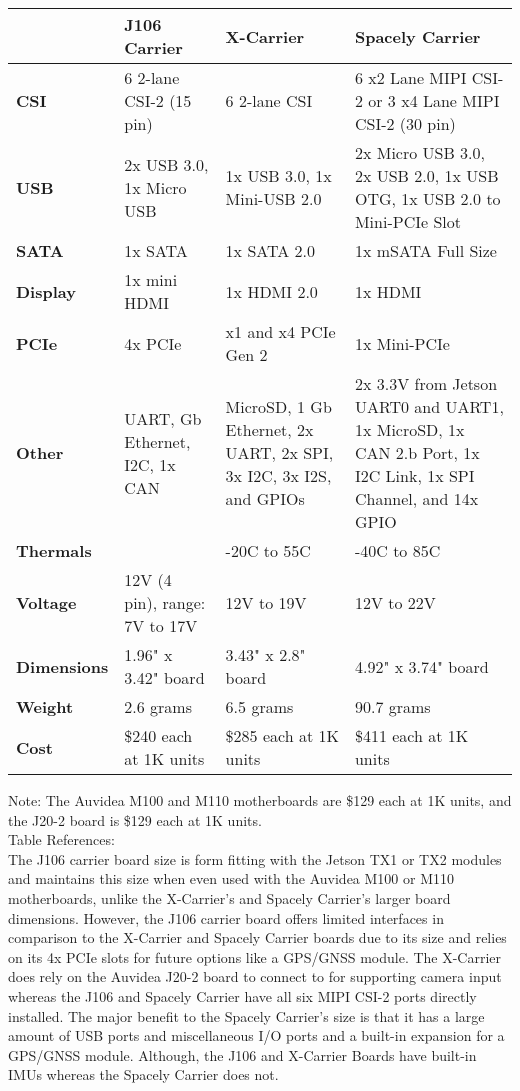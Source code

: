 \begin{tabular}{|l|p{5cm}|p{5cm}|p{5cm}|}
	\hline
	\textbf{} & \textbf{J106 Carrier} & \textbf{X-Carrier} & \textbf{Spacely Carrier}\\
	\hline
	\textbf{CSI} & 6 2-lane CSI-2 (15 pin) & 6 2-lane CSI & 6 x2 Lane MIPI CSI-2 or 3 x4 Lane MIPI CSI-2 (30 pin)\\
	\hline
	\textbf{USB} & 2x USB 3.0, 1x Micro USB & 1x USB 3.0, 1x Mini-USB 2.0 & 2x Micro USB 3.0, 2x USB 2.0, 1x USB OTG, 1x USB 2.0 to Mini-PCIe Slot \\
	\hline
	\textbf{SATA} & 1x SATA & 1x SATA 2.0 & 1x mSATA Full Size \\
	\hline
	\textbf{Display} & 1x mini HDMI & 1x HDMI 2.0 & 1x HDMI \\
	\hline
	\textbf{PCIe} & 4x PCIe & x1 and x4 PCIe Gen 2 & 1x Mini-PCIe \\
	\hline
	\textbf{Other} & UART, Gb Ethernet, I2C, 1x CAN & MicroSD, 1 Gb Ethernet, 2x UART, 2x SPI, 3x I2C, 3x I2S, and GPIOs & 2x 3.3V from Jetson UART0 and UART1, 1x MicroSD, 1x CAN 2.b Port, 1x I2C Link, 1x SPI Channel, and 14x GPIO \\
	\hline
	\textbf{Thermals} &  & -20\degree C to 55\degree C & -40\degree C to 85\degree C \\
	\hline
	\textbf{Voltage} & 12V (4 pin), range: 7V to 17V & 12V to 19V & 12V to 22V \\
	\hline
	\textbf{Dimensions} & 1.96" x 3.42" board & 3.43" x 2.8" board & 4.92" x 3.74" board \\
	\hline
	\textbf{Weight} & 2.6 grams & 6.5 grams & 90.7 grams \\
	\hline
	\textbf{Cost} & \$240 each at 1K units & \$285 each at 1K units & \$411 each at 1K units \\
	\hline
\end{tabular}	
\newline
\newline
\newline
Note: The Auvidea M100 and M110 motherboards are \$129 each at 1K units, and the 
J20-2 board is \$129 each at 1K units. \\
Table References: \cite{AuvideaJ106, MouserJ106, CEIX, CEIXpdf, SpacelyUG, SpacelyQuote, CEIQuote, AuvideaQuote}\\

The J106 carrier board size is form fitting with the Jetson TX1 or TX2 modules and 
maintains this size when even used with the Auvidea M100 or M110 motherboards, unlike 
the X-Carrier's and Spacely Carrier's larger board dimensions. However, the J106 carrier board 
offers limited interfaces in comparison to the X-Carrier and Spacely Carrier boards due 
to its size and relies on its 4x PCIe slots for future options like a GPS/GNSS module. The 
X-Carrier does rely on the Auvidea J20-2 board to connect to for supporting  
camera input whereas the J106 and Spacely Carrier have all six MIPI CSI-2 ports directly 
installed. The major benefit to the Spacely Carrier's size is that it has a large 
amount of USB ports and miscellaneous I/O ports and a built-in expansion for a 
GPS/GNSS module. Although, the J106 and X-Carrier Boards have built-in IMUs whereas the 
Spacely Carrier does not.\\

